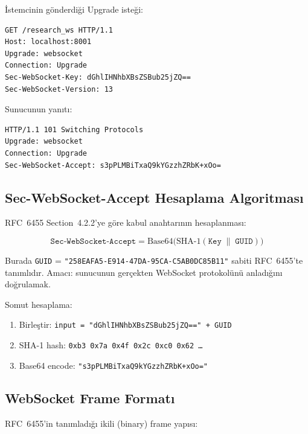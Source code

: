 \.{I}stemcinin g\"{o}nderdi\u{g}i Upgrade iste\u{g}i:

\begin{lstlisting}
GET /research_ws HTTP/1.1
Host: localhost:8001
Upgrade: websocket
Connection: Upgrade
Sec-WebSocket-Key: dGhlIHNhbXBsZSBub25jZQ==
Sec-WebSocket-Version: 13
\end{lstlisting}

Sunucunun yan{\i}t{\i}:

\begin{lstlisting}
HTTP/1.1 101 Switching Protocols
Upgrade: websocket
Connection: Upgrade
Sec-WebSocket-Accept: s3pPLMBiTxaQ9kYGzzhZRbK+xOo=
\end{lstlisting}


\subsection{Sec-WebSocket-Accept Hesaplama Algoritmas{\i}}
\label{sec:ws-accept}

RFC~6455 Section~4.2.2'ye g\"{o}re kabul anahtar{\i}n{\i}n hesaplanmas{\i}:

\begin{equation}
\label{eq:ws-accept}
\texttt{Sec-WebSocket-Accept} = \mathrm{Base64}\bigl(\mathrm{SHA\text{-}1}(\texttt{Key} \;\|\; \texttt{GUID})\bigr)
\end{equation}

Burada \texttt{GUID} = \texttt{"258EAFA5-E914-47DA-95CA-C5AB0DC85B11"} sabiti RFC~6455'te tan{\i}ml{\i}d{\i}r. Amac{\i}: sunucunun ger\c{c}ekten WebSocket protokol\"{u}n\"{u} anlad{\i}\u{g}{\i}n{\i} do\u{g}rulamak.

\begin{ornek}
Somut hesaplama:
\begin{enumerate}
  \item Birle\c{s}tir: \texttt{input = "dGhlIHNhbXBsZSBub25jZQ==" + GUID}
  \item SHA-1 hash: \texttt{0xb3 0x7a 0x4f 0x2c 0xc0 0x62 \ldots}
  \item Base64 encode: \texttt{"s3pPLMBiTxaQ9kYGzzhZRbK+xOo="}
\end{enumerate}
\end{ornek}


\subsection{WebSocket Frame Format{\i}}
\label{sec:ws-frame}

RFC~6455'in tan{\i}mlad{\i}\u{g}{\i} ikili (binary) frame yap{\i}s{\i}:

